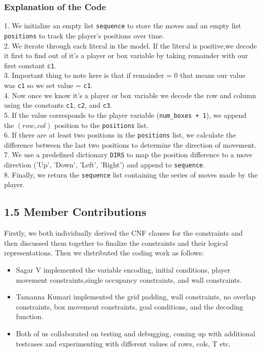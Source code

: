 \documentclass[12pt,a4paper]{article}
\begin{document}
\subsubsection*{Explanation of the Code}
1. We initialize an empty list \texttt{sequence} to store the moves and an empty list \texttt{positions} to track the player's positions over time.\\
2. We iterate through each literal in the model. If the literal is positive,we decode it first to find out of it's a player or box variable by taking remainder with our first constant \texttt{c1}.\\
3. Important thing to note here is that if remainder = 0 that means our value was \texttt{c1} so we set value = \texttt{c1}.\\
4. Now once we know it's a player or box variable we decode the row and column using the constants \texttt{c1}, \texttt{c2}, and \texttt{c3}. \\
5. If the value corresponds to the player variable (\texttt{num\_boxes + 1}), we append the \((row, col)\) position to the \texttt{positions} list.\\
6. If there are at least two positions in the \texttt{positions} list, we calculate the difference between the last two positions to determine the direction of movement.\\
7. We use a predefined dictionary \texttt{DIRS} to map the position difference to a move direction ('Up', 'Down', 'Left', 'Right') and append to \texttt{sequence}.\\
8. Finally, we return the \texttt{sequence} list containing the series of moves made by the player.\\

\subsection*{1.5 Member Contributions}
Firstly, we both individually derived the CNF clauses for the constraints and then discussed them together to finalize the constraints and their logical representations.
Then we distributed the coding work as follows:
\begin{itemize}
    \item Sagar V implemented the variable encoding, initial conditions, player movement constraints,single occupancy constraints, and wall constraints.
    \item Tamanna Kumari implemented the grid padding, wall constraints,  no overlap constraints, box movement constraints, goal conditions, and the decoding function.
    \item Both of us collaborated on testing and debugging, coming up with additional testcases and experimenting with different values of rows, cols, T etc. 
\end{itemize}
\end{document}
